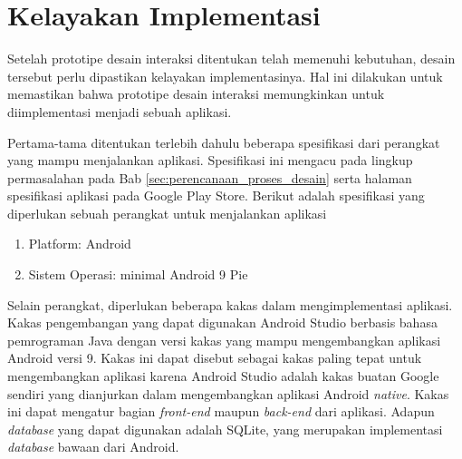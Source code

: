 \section{Kelayakan Implementasi}
\label{sec:kelayakan}

Setelah prototipe desain interaksi ditentukan telah memenuhi kebutuhan, desain tersebut perlu dipastikan kelayakan implementasinya. Hal ini dilakukan untuk memastikan bahwa prototipe desain interaksi memungkinkan untuk diimplementasi menjadi sebuah aplikasi.

Pertama-tama ditentukan terlebih dahulu beberapa spesifikasi dari perangkat yang mampu menjalankan aplikasi. Spesifikasi ini mengacu pada lingkup permasalahan pada Bab \ref{sec:perencanaan_proses_desain} serta halaman spesifikasi aplikasi pada Google Play Store. Berikut adalah spesifikasi yang diperlukan sebuah perangkat untuk menjalankan aplikasi

\begin{enumerate}
  \item Platform: Android
  \item Sistem Operasi: minimal Android 9 Pie
\end{enumerate}

Selain perangkat, diperlukan beberapa kakas dalam mengimplementasi aplikasi. Kakas pengembangan yang dapat digunakan Android Studio berbasis bahasa pemrograman Java dengan versi kakas yang mampu mengembangkan aplikasi Android versi 9. Kakas ini dapat disebut sebagai kakas paling tepat untuk mengembangkan aplikasi karena Android Studio adalah kakas buatan Google sendiri yang dianjurkan dalam mengembangkan aplikasi Android \textit{native}. Kakas ini dapat mengatur bagian \textit{front-end} maupun \textit{back-end} dari aplikasi. Adapun \textit{database} yang dapat digunakan adalah SQLite, yang merupakan implementasi \textit{database} bawaan dari Android.

